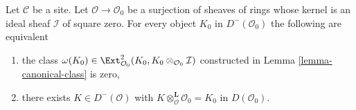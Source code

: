 %
\begin{lemma}
\label{lemma-canonical-class-obstruction}
Let $\mathcal{C}$ be a site. Let $\mathcal{O} \to \mathcal{O}_0$
be a surjection of sheaves of rings whose kernel is an ideal sheaf
$\mathcal{I}$ of square zero. For every object
$K_0$ in $D^-(\mathcal{O}_0)$ the following are equivalent
\begin{enumerate}
\item  the class
$\omega(K_0) \in
\Ext^2_{\mathcal{O}_0}(K_0, K_0 \otimes_{\mathcal{O}_0} \mathcal{I})$
constructed in Lemma \ref{lemma-canonical-class} is zero,
\item there exists $K \in D^-(\mathcal{O})$ with
$K \otimes_\mathcal{O}^\mathbf{L} \mathcal{O}_0 = K_0$
in $D(\mathcal{O}_0)$.
\end{enumerate}
\end{lemma}

